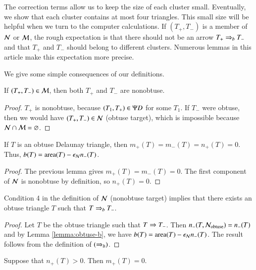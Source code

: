 The correction terms allow us to keep the size of each cluster small.
Eventually, we show that each cluster contains at most four triangles.
This small size will be helpful when we turn to the computer
calculations.  If $(T_+,T_-)$ is a member of $\mathcal N$ or $\mathcal M$, the rough
expectation is that there should not be an arrow $T_+\Rightarrow_{b} T_-$ and
that $T_+$ and $T_-$ should belong to different clusters.  Numerous
lemmas in this article make this expectation more precise.

We give some simple consequences of our definitions.

\begin{lemma} 
  If $(T_+,T_-)\in \mathcal M$, then both $T_+$ and $T_-$ are nonobtuse.
\end{lemma}

\begin{proof} 
  $T_+$ is nonobtuse, because $(T_1,T_+)\in\Psi D$ for some $T_1$.  If $T_-$
  were obtuse, then we would have $(T_+,T_-)\in \mathcal N$ (obtuse target),
  which is impossible because $\mathcal N\cap \mathcal M = \varnothing$.
\end{proof}

\begin{lemma}[obtuse $b$] 
  If $T$ is an obtuse Delaunay triangle, then
  $m_+(T)=m_-(T)=n_+(T)=0$.  Thus, $b(T) = {\operatorname{area}}(T) - \epsilon_{\mathcal N} n_-(T)$.
\end{lemma}

\begin{proof} 
  The previous lemma gives $m_+(T)=m_-(T)=0$.  The first component of
  $\mathcal N$ is nonobtuse by definition, so $n_+(T)=0$.
\end{proof}

\begin{corollary} 
  Condition 4 in the definition of $\mathcal N$ (nonobtuse target) implies
  that there exists an obtuse triangle $T$ such that $T\Rightarrow_{b} T_-$.
\end{corollary}

\begin{proof} 
  Let $T$ be the obtuse triangle such that $T\Rightarrow T_-$.  Then
  $n_-(T,\mathcal N_{\text{obtuse}}) = n_-(T)$ and by Lemma
  \ref{lemma:obtuse-b}, we have $b(T) = {\operatorname{area}}(T)-\epsilon_{\mathcal N} n_-(T)$.  The
  result follows from the definition of $(\Rightarrow_{b})$.
\end{proof}


\begin{lemma}  
  Suppose that $n_+(T)>0$. Then $m_+(T)=0$.
\end{lemma}

